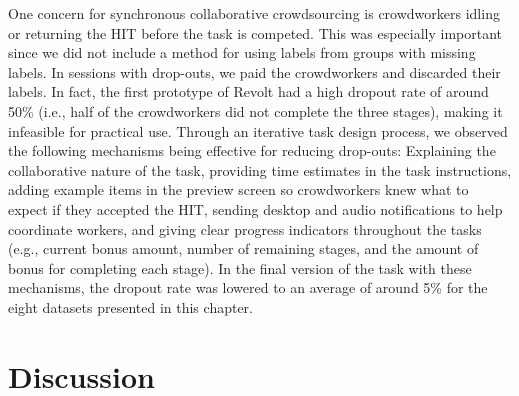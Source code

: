 One concern for synchronous collaborative crowdsourcing is crowdworkers idling or returning the HIT before the task is competed. This was especially important since we did not include a method for using labels from groups with missing labels. In sessions with drop-outs, we paid the crowdworkers and discarded their labels. In fact, the first prototype of Revolt had a high dropout rate of around 50\% (i.e., half of the crowdworkers did not complete the three stages), making it infeasible for practical use. Through an iterative task design process, we observed the following mechanisms being effective for reducing drop-outs: Explaining the collaborative nature of the task, providing time estimates in the task instructions, adding example items in the preview screen so crowdworkers knew what to expect if they accepted the HIT, sending desktop and audio notifications to help coordinate workers, and giving clear progress indicators throughout the tasks (e.g., current bonus amount, number of remaining stages, and the amount of bonus for completing each stage). In the final version of the task with these mechanisms, the dropout rate was lowered to an average of around 5\% for the eight datasets presented in this chapter.

\section{Discussion}



